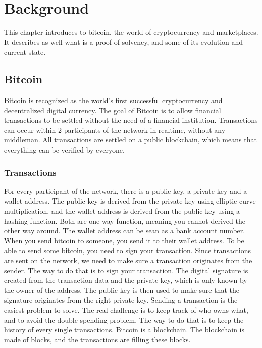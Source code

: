 
\chapter{Background}
This chapter introduces to bitcoin, the world of cryptocurrency and marketplaces. It describes as well 
what is a proof of solvency, and some of its evolution and current state.

\section{Bitcoin}

Bitcoin is recognized as the world's first successful cryptocurrency and decentralized digital currency. 
The goal of Bitcoin is to allow financial transactions to be settled without the need of a financial institution.
Transactions can occur within 2 participants of the network in realtime, without any middleman. 
All transactions are settled on a public blockchain, which means that everything can be verified by everyone. 


\subsection{Transactions}
For every participant of the network, there is a public key,  a private key and a wallet address.
The public key is derived from the private key using elliptic curve multiplication, and the wallet address is derived from the public key using a hashing function.
Both are one way function, meaning you cannot derived the other way around.
The wallet address can be sean as a bank account number. When you send bitcoin to someone, you send it to their wallet address.
To be able to send some bitcoin, you need to sign your transaction. 
Since transactions are sent on the network, we need to make sure a transaction originates from the sender.
The way to do that is to sign your transaction. The digital signature is created from the transaction data and the private key, which is only known by the owner of the address.
The public key is then used to make sure that the signature originates from the right private key.
Sending a transaction is the easiest problem to solve. The real challenge is to keep track of who owns what, and to avoid the double spending problem.
The way to do that is to keep the history of every single transactions. 
Bitcoin is a blockchain. The blockchain is made of blocks, and the transactions are filling these blocks.


